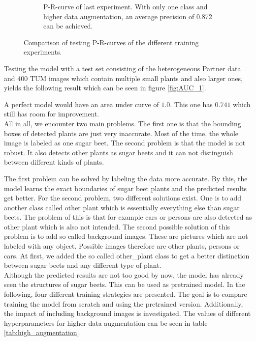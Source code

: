 \begin{figure}[htb!]
\begin{subfigure}{1\textwidth}
		\caption{P-R-curve of last experiment. With only one class and higher data augmentation, an average precision of 0.872 can be achieved.}
		\label{fig:AUC_5}
	\end{subfigure}
	\caption{Comparison of testing P-R-curves of the different training experiments.}
	\label{fig:AUC_comparison}
\end{figure}

Testing the model with a test set consisting of the heterogeneous Partner data and 400 TUM images which contain multiple small plants and also larger ones, yields the following result which can be seen in figure \ref{fig:AUC_1}.

A perfect model would have an area under curve of $ 1.0 $. This one has $ 0.741 $ which still has room for improvement.\\


All in all, we encounter two main problems. The first one is that the bounding boxes of detected plants are just very inaccurate. Most of the time, the whole image is labeled as one sugar beet. The second problem is that the model is not robust. It also detects other plants as sugar beets and it can not distinguish between different kinds of plants.

The first problem can be solved by labeling the data more accurate. By this, the model learns the exact boundaries of sugar beet plants and the predicted results get better. For the second problem, two different solutions exist. One is to add another class called other plant which is essentially everything else than sugar beets. The problem of this is that for example cars or persons are also detected as other plant which is also not intended. The second possible solution of this problem is to add so called background images. These are pictures which are not labeled with any object. Possible images therefore are other plants, persons or cars. At first, we added the so called other\_plant class to get a better distinction between sugar beets and any different type of plant. \\

Although the predicted results are not too good by now, the model has already seen the structures of sugar beets. This can be used as pretrained model. In the following, four different training strategies are presented. The goal is to compare training the model from scratch and using the pretrained version. Additionally, the impact of including background images is investigated. The values of different hyperparameters for higher data augmentation can be seen in table \ref{tab:high_augmentation}.


